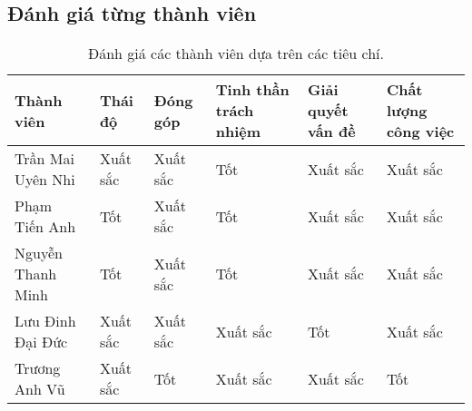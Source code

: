 \documentclass[a4paper, 12pt]{article}
\begin{document}
\subsection{Đánh giá từng thành viên}
\begin{table}[h!]
\centering
\renewcommand{\arraystretch}{1.5} %
\setlength{\tabcolsep}{10pt} %
\begin{tabular}{|p{4cm}|p{1.5cm}|p{1.5cm}|p{1.5cm}|p{1.5cm}|p{1.5cm}|}
    \hline
    \textbf{Thành viên} & \textbf{Thái độ} & \textbf{Đóng góp} & \textbf{Tinh thần trách nhiệm} & \textbf{Giải quyết vấn đề} & \textbf{Chất lượng công việc} \\
    \hline
    Trần Mai Uyên Nhi & Xuất sắc & Xuất sắc & Tốt & Xuất sắc & Xuất sắc \\
    \hline
    Phạm Tiến Anh & Tốt & Xuất sắc & Tốt & Xuất sắc & Xuất sắc \\
    \hline
    Nguyễn Thanh Minh & Tốt & Xuất sắc & Tốt & Xuất sắc & Xuất sắc \\
    \hline
    Lưu Đinh Đại Đức & Xuất sắc & Xuất sắc & Xuất sắc & Tốt & Xuất sắc \\
    \hline
    Trương Anh Vũ & Xuất sắc & Tốt & Xuất sắc & Xuất sắc & Tốt \\
    \hline
\end{tabular}
\caption{Đánh giá các thành viên dựa trên các tiêu chí.}
\label{tab:member-evaluation}
\end{table}
\end{document}
